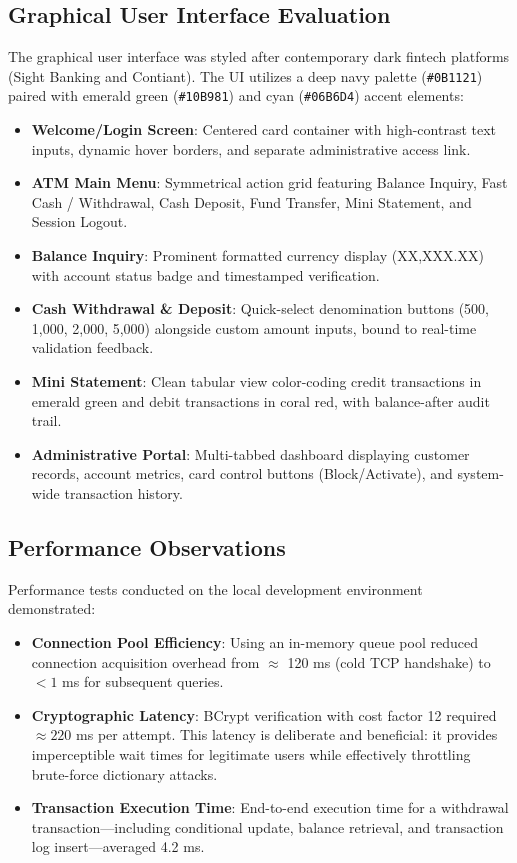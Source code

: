 \documentclass[11pt,a4paper]{report}
\begin{document}
\subsection{Graphical User Interface Evaluation}
The graphical user interface was styled after contemporary dark fintech platforms (Sight Banking and Contiant). The UI utilizes a deep navy palette (\texttt{\#0B1121}) paired with emerald green (\texttt{\#10B981}) and cyan (\texttt{\#06B6D4}) accent elements:
\begin{itemize}
    \item \textbf{Welcome/Login Screen}: Centered card container with high-contrast text inputs, dynamic hover borders, and separate administrative access link.
    \item \textbf{ATM Main Menu}: Symmetrical action grid featuring Balance Inquiry, Fast Cash / Withdrawal, Cash Deposit, Fund Transfer, Mini Statement, and Session Logout.
    \item \textbf{Balance Inquiry}: Prominent formatted currency display (XX,XXX.XX) with account status badge and timestamped verification.
    \item \textbf{Cash Withdrawal \& Deposit}: Quick-select denomination buttons (500, 1,000, 2,000, 5,000) alongside custom amount inputs, bound to real-time validation feedback.
    \item \textbf{Mini Statement}: Clean tabular view color-coding credit transactions in emerald green and debit transactions in coral red, with balance-after audit trail.
    \item \textbf{Administrative Portal}: Multi-tabbed dashboard displaying customer records, account metrics, card control buttons (Block/Activate), and system-wide transaction history.
\end{itemize}

\subsection{Performance Observations}
Performance tests conducted on the local development environment demonstrated:
\begin{itemize}
    \item \textbf{Connection Pool Efficiency}: Using an in-memory queue pool reduced connection acquisition overhead from $\approx$ 120 ms (cold TCP handshake) to $< 1$ ms for subsequent queries.
    \item \textbf{Cryptographic Latency}: BCrypt verification with cost factor 12 required $\approx 220$ ms per attempt. This latency is deliberate and beneficial: it provides imperceptible wait times for legitimate users while effectively throttling brute-force dictionary attacks.
    \item \textbf{Transaction Execution Time}: End-to-end execution time for a withdrawal transaction—including conditional update, balance retrieval, and transaction log insert—averaged 4.2 ms.
\end{itemize}
\end{document}
